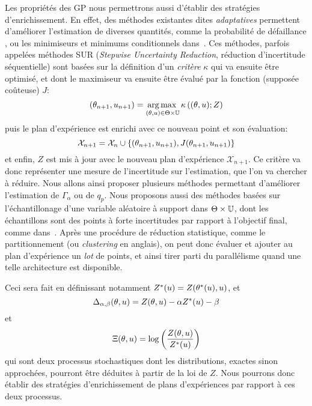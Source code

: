 \documentclass[../../Main_ManuscritThese.tex]{subfiles}
\begin{document}
Les propriétés des GP nous permettrons aussi d'établir des stratégies
d'enrichissement. En effet, des méthodes existantes dites
\emph{adaptatives} permettent d'améliorer l'estimation de diverses
quantités, comme la probabilité de défaillance
\citep{razaaly_rare_2019,moustapha_quantile-based_2016,bect_sequential_2012},
ou les minimiseurs et minimums conditionnels
dans~\cite{ginsbourger_bayesian_2014}. Ces méthodes, parfois appelées
méthodes SUR (\emph{Stepwise Uncertainty Reduction}, réduction
d'incertitude séquentielle) sont basées sur la définition d'un
\emph{critère} $\kappa$ qui va ensuite être optimisé, et dont le
maximiseur va ensuite être évalué par la fonction (supposée coûteuse)
$J$:
\begin{equation*}
  (\theta_{n+1}, u_{n+1}) = \operatorname*{arg\,max \,}_{(\theta,u) \in \Theta\times\mathbb{U}} \kappa\left((\theta, u); Z\right)
\end{equation*}
puis le plan d'expérience est enrichi avec ce nouveau point et son évaluation:
\begin{equation*}
\mathcal{X}_{n+1} = \mathcal{X}_n \cup \{(\theta_{n+1}, u_{n+1}), J(\theta_{n+1}, u_{n+1})\}
\end{equation*}
et enfin, $Z$ est mis à jour avec le nouveau plan d'expérience
$\mathcal{X}_{n+1}$.  Ce critère va donc représenter une mesure de
l'incertitude sur l'estimation, que l'on va chercher à réduire. Nous
allons ainsi proposer plusieurs méthodes permettant d'améliorer
l'estimation de $\Gamma_{\alpha}$ ou de $q_p$.  Nous proposons aussi
des méthodes basées sur l'échantillonage d'une variable aléatoire à
support dans $\Theta\times \mathbb{U}$, dont les échantillons sont des
points à forte incertitudes par rapport à l'objectif final, comme
dans~\cite{echard_ak-mcs_2011,razaaly_rare_2019}. Après une procédure
de réduction statistique, comme le partitionnement (ou
\emph{clustering} en anglais), on peut donc évaluer et ajouter au plan
d'expérience un \emph{lot} de points, et ainsi tirer parti du
parallélisme quand une telle architecture est disponible.

Ceci sera fait en définissant notamment
$Z^*(u) = Z(\theta^*(u),u)$, et
\begin{equation*}
  \Delta_{\alpha,\beta}(\theta, u) = Z(\theta, u) - \alpha Z^*(u) - \beta
\end{equation*}
et
\begin{equation*}
  \Xi(\theta, u) = \log\left(\frac{Z(\theta, u)}{Z^*(u)}\right)
\end{equation*}
qui sont deux processus stochastiques dont les distributions, exactes
sinon approchées, pourront être déduites à partir de la loi de $Z$.
Nous pourrons donc établir des stratégies d'enrichissement de plans
d'expériences par rapport à ces deux processus.
\end{document}
